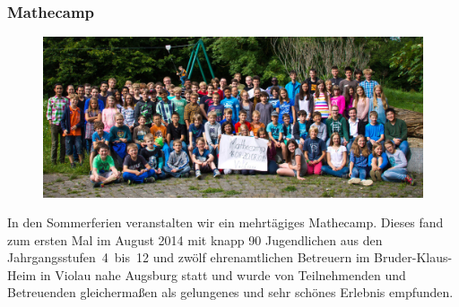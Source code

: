 \documentclass[12pt]{zettel}
\begin{document}









\subsubsection*{Mathecamp}

\begin{figure}[b!]
  \centering
   \includegraphics[width=\textwidth]{impressionen/klein-13}
\end{figure}

In den Sommerferien veranstalten wir ein mehrtägiges Mathecamp. Dieses fand zum ersten Mal im August 2014 mit knapp 90 Jugendlichen aus den Jahrgangsstufen~4~bis~12 und zwölf ehrenamtlichen Betreuern im Bruder-Klaus-Heim in Violau nahe Augsburg statt und wurde von Teilnehmenden und Betreuenden gleichermaßen als gelungenes und sehr schönes Erlebnis empfunden.
\end{document}
